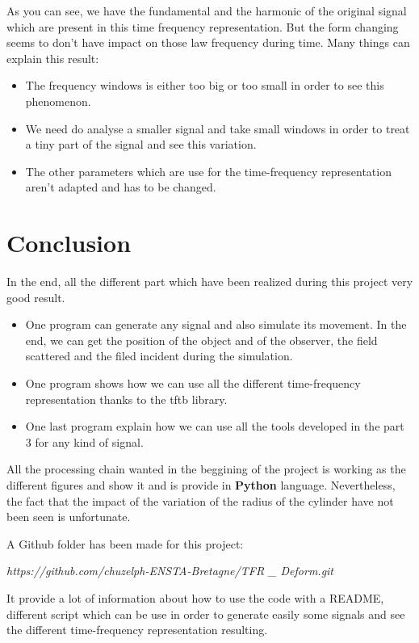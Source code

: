 As you can see, we have the fundamental and the harmonic of the original signal which are present in this time frequency representation. But the form changing seems to don't have impact on those law frequency during time. Many things can explain this result:

\begin{itemize}
\item The frequency windows is either too big or too small in order to see this phenomenon.
\item We need do analyse a smaller signal and take small windows in order to treat a tiny part of the signal and see this variation.
\item The other parameters which are use for the time-frequency representation aren't adapted and has to be changed.
\end{itemize}


\part{Conclusion}

\bigskip

In the end, all the different part which have been realized during this project very good result.

\medskip

\begin{itemize}
\item One program can generate any signal and also simulate its movement. In the end, we can get the position of the object and of the observer, the field scattered and the filed incident during the simulation.
\item One program shows how we can use all the different time-frequency representation thanks to the tftb library.
\item One last program explain how we can use all the tools developed in the part 3 for any kind of signal.
\end{itemize}

\medskip

All the processing chain wanted in the beggining of the project is working as the different figures \label{TFR3} and \label{SpectrogramObjMov} show it and is provide in \textbf{Python} language. 
Nevertheless, the fact that the impact of the variation of the radius of the cylinder have not been seen is unfortunate.

\medskip

A Github folder has been made for this project:

\medskip

\textit{https://github.com/chuzelph-ENSTA-Bretagne/TFR \_ Deform.git}

\medskip

It provide a lot of information about how to use the code with a README, different script which can be use in order to generate easily some signals and see the different time-frequency representation resulting.